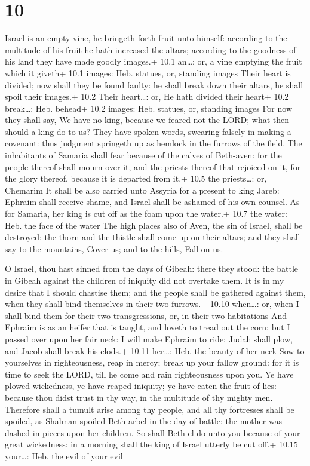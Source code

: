 \hypertarget{section-9}{%
\section{10}\label{section-9}}

 Israel is an empty vine, he bringeth forth fruit unto
himself: according to the multitude of his fruit he hath increased the
altars; according to the goodness of his land they have made goodly
images.+ 10.1 an\ldots: or, a vine emptying the fruit which it giveth+
10.1 images: Heb. statues, or, standing images  Their heart
is divided; now shall they be found faulty: he shall break down their
altars, he shall spoil their images.+ 10.2 Their heart\ldots: or, He
hath divided their heart+ 10.2 break\ldots: Heb. behead+ 10.2 images:
Heb. statues, or, standing images  For now they shall say,
We have no king, because we feared not the LORD; what then should a king
do to us?  They have spoken words, swearing falsely in
making a covenant: thus judgment springeth up as hemlock in the furrows
of the field.  The inhabitants of Samaria shall fear because
of the calves of Beth-aven: for the people thereof shall mourn over it,
and the priests thereof that rejoiced on it, for the glory thereof,
because it is departed from it.+ 10.5 the priests\ldots: or, Chemarim
 It shall be also carried unto Assyria for a present to king
Jareb: Ephraim shall receive shame, and Israel shall be ashamed of his
own counsel.  As for Samaria, her king is cut off as the
foam upon the water.+ 10.7 the water: Heb. the face of the water
 The high places also of Aven, the sin of Israel, shall be
destroyed: the thorn and the thistle shall come up on their altars; and
they shall say to the mountains, Cover us; and to the hills, Fall on us.

 O Israel, thou hast sinned from the days of Gibeah: there
they stood: the battle in Gibeah against the children of iniquity did
not overtake them.  It is in my desire that I should
chastise them; and the people shall be gathered against them, when they
shall bind themselves in their two furrows.+ 10.10 when\ldots: or, when
I shall bind them for their two transgressions, or, in their two
habitations  And Ephraim is as an heifer that is taught,
and loveth to tread out the corn; but I passed over upon her fair neck:
I will make Ephraim to ride; Judah shall plow, and Jacob shall break his
clods.+ 10.11 her\ldots: Heb. the beauty of her neck  Sow
to yourselves in righteousness, reap in mercy; break up your fallow
ground: for it is time to seek the LORD, till he come and rain
righteousness upon you.  Ye have plowed wickedness, ye have
reaped iniquity; ye have eaten the fruit of lies: because thou didst
trust in thy way, in the multitude of thy mighty men. 
Therefore shall a tumult arise among thy people, and all thy fortresses
shall be spoiled, as Shalman spoiled Beth-arbel in the day of battle:
the mother was dashed in pieces upon her children.  So
shall Beth-el do unto you because of your great wickedness: in a morning
shall the king of Israel utterly be cut off.+ 10.15 your\ldots: Heb. the
evil of your evil


